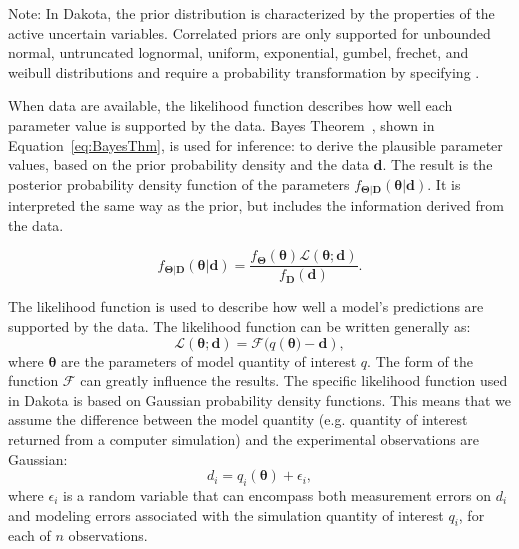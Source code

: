 Note: In Dakota, the prior distribution is characterized by the
properties of the active uncertain variables. Correlated priors are
only supported for unbounded normal, untruncated lognormal, uniform,
exponential, gumbel, frechet, and weibull distributions and require a
probability transformation by specifying
.

When data are available, the likelihood function describes how well
each parameter value is supported by the data. Bayes
Theorem~\cite{Jaynes}, shown in Equation~\ref{eq:BayesThm}, is used
for inference: to derive the plausible parameter values, based on the
prior probability density and the data $\boldsymbol{d}$. The result is
the posterior probability density function of the parameters
$f_{\boldsymbol{{\Theta |D}}}\left( \boldsymbol{{\theta |d}}
\right)$. It is interpreted the same way as the prior, but includes
the information derived from the data.
 
\begin{equation}
{f_{\boldsymbol{\Theta |D}}}\left( \boldsymbol{\theta |d} \right) = \frac{{{f_{\boldsymbol{\Theta}}}\left( \boldsymbol{\theta}  \right)\mathcal{L}\left( \boldsymbol{\theta;d} \right)}}{{{f_{\boldsymbol{D}}}\left( \boldsymbol{d} \right)}}. \label{eq:BayesThm}
\end{equation}



The likelihood function is used to describe how well a model's
predictions are supported by the data.  The likelihood function can be
written generally as:
\begin{equation*}
  \mathcal{L}\left(\boldsymbol{{\theta ;d}} \right) =  \mathcal{F}(q(\boldsymbol{\theta)} -\boldsymbol{d}),
\end{equation*}
where $\boldsymbol{\theta}$ are the parameters of model quantity of
interest $q$.  The form of the function $\mathcal{F}$ can greatly
influence the results.  The specific likelihood function used in
Dakota is based on Gaussian probability density functions. This means
that we assume the difference between the model quantity
(e.g. quantity of interest returned from a computer simulation) and
the experimental observations are Gaussian:
\begin{equation}\label{eq:model}
d_i = q_i(\boldsymbol{\theta}) + \epsilon_i,
\end{equation}
where $\epsilon_i$ is a random variable that can encompass both
measurement errors on $d_i$ and modeling errors associated with the
simulation quantity of interest $q_i$, for each of $n$ observations.

